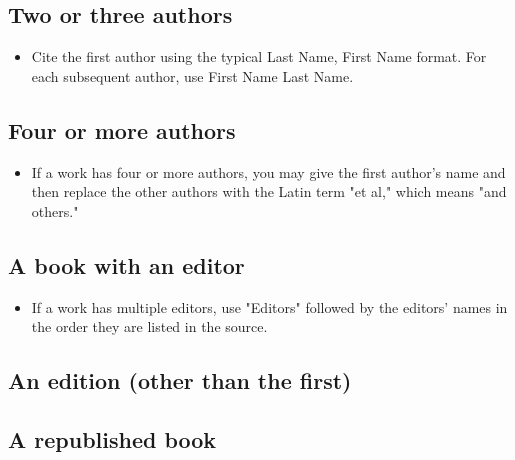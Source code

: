 {\subsection{Two or three authors}



\begin{itemize}\item Cite the first author using the typical Last Name, First Name format. For each subsequent author, use First Name Last Name.\end{itemize}

\subsection{Four or more authors}



\begin{itemize}\item If a work has four or more authors, you may give the first author's name and then replace the other authors with the Latin term "et al," which means "and others." \end{itemize}

\subsection{A book with an editor}

\begin{itemize}\item If a work has multiple editors, use "Editors" followed by the editors' names in the order they are listed in the source. \end{itemize}


\subsection{An edition (other than the first)}

\subsection{A republished book}

}
